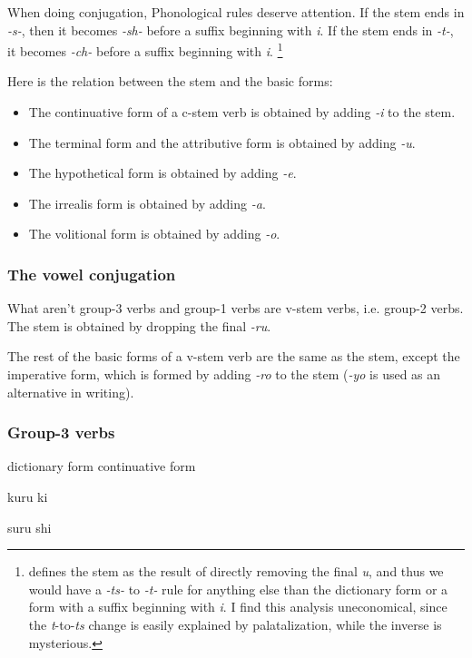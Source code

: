 \documentclass[UTF8, a4paper, oneside, scheme=plain]{ctexart}
\newcommand{\corpus}[1]{\emph{#1}}
\begin{document}
When doing conjugation, Phonological rules deserve attention.
If the stem ends in \corpus{-s-}, 
then it becomes \corpus{-sh-} before a suffix beginning with \corpus{i}.
If the stem ends in \corpus{-t-},
it becomes \corpus{-ch-} before a suffix beginning with \corpus{i}.%
\footnote{
    \citet{akiyama2012japanese} defines the stem as the result of directly removing the final \corpus{u},
    and thus we would have a \corpus{-ts-} to \corpus{-t-} rule 
    for anything else than the dictionary form or a form with a suffix beginning with \corpus{i}.
    I find this analysis uneconomical,
    since the \corpus{t}-to-\corpus{ts} change is easily explained by palatalization,
    while the inverse is mysterious.
}

Here is the relation between the stem and the basic forms:
\begin{itemize}
    \item The continuative form of a c-stem verb is obtained by adding \corpus{-i} to the stem.
    \item The terminal form and the attributive form is obtained by adding \corpus{-u}.
    \item The hypothetical form is obtained by adding \corpus{-e}.
    \item The irrealis form is obtained by adding \corpus{-a}.
    \item The volitional form is obtained by adding \corpus{-o}.
\end{itemize}

\subsubsection{The vowel conjugation}

What aren't group-3 verbs and group-1 verbs are v-stem verbs, i.e. group-2 verbs.
The stem is obtained by dropping the final \corpus{-ru}.

The rest of the basic forms of a v-stem verb are the same as the stem,
except the imperative form,
which is formed by adding \corpus{-ro} to the stem 
(\corpus{-yo} is used as an alternative in writing).

\subsubsection{Group-3 verbs}

dictionary form continuative form 

kuru ki 

suru shi
\end{document}
